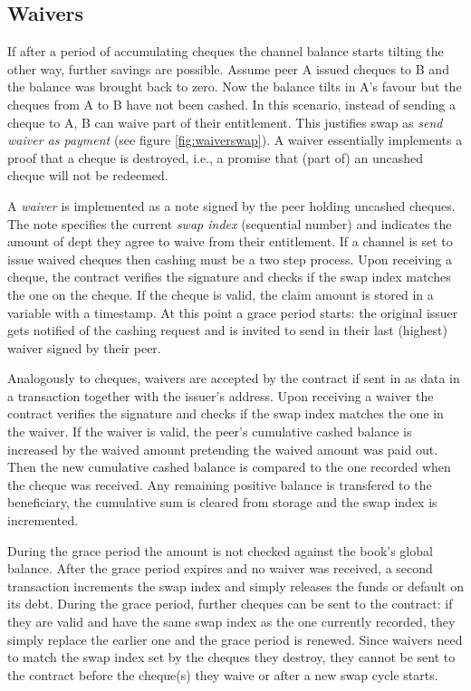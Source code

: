 \documentclass[a4paper,10pt]{article}
\newcommand\gloss[1]{\emph{\gls{#1}}}
\begin{document}
\subsection{Waivers}

If after a period of accumulating cheques the channel balance starts tilting the other way,
further savings are possible.
Assume peer A issued cheques to B and the balance was brought back to zero.
Now the balance tilts in A's favour but the cheques from A to B have not been cashed.
In this scenario, instead of sending a cheque to A, B can waive part of their entitlement.
This justifies swap as \emph{send waiver as payment} (see figure \ref{fig:waiverswap}).
A waiver essentially implements a proof that a cheque is destroyed, i.e., a promise
that (part of) an uncashed cheque will not be redeemed.

A \gloss{waiver} is implemented as a note signed by the peer holding uncashed cheques.
The note specifies the current \gloss{swap index} (sequential number) and
indicates the amount of dept they agree to waive from their entitlement.
If a channel is set to issue waived cheques then cashing must be a two step process.
Upon receiving a cheque, the contract verifies the signature and checks if
the swap index matches the one on the cheque.
If the cheque is valid, the claim amount is stored in a variable with a timestamp.
At this point a grace period starts: the original issuer gets notified of the cashing
request and is invited to send in their last (highest) waiver signed by their peer.

Analogously to cheques, waivers are accepted by the contract if sent in as data in
a transaction together with the issuer's address.
Upon receiving a waiver the contract verifies the signature and
checks if the swap index matches the one in the waiver.
If the waiver is valid, the peer's cumulative cashed balance is increased by the waived amount
pretending the waived amount was paid out. Then the new cumulative cashed balance is
compared to the one recorded when the cheque was received. Any remaining positive balance
is transfered to the beneficiary, the cumulative sum is cleared from storage and
the swap index is incremented.

During the grace period the amount is not checked against the book's global balance.
After the grace period expires and no waiver was received, a second transaction
increments the swap index and simply releases the funds or default on its debt.
During the grace period, further cheques can be sent to the contract: if they are valid
and have the same swap index as the one currently recorded, they simply replace
the earlier one and the grace period is renewed.
Since waivers need to match the swap index set by the cheques they destroy, they cannot
be sent to the contract before the cheque(s) they waive or after a new swap cycle starts.
\end{document}
